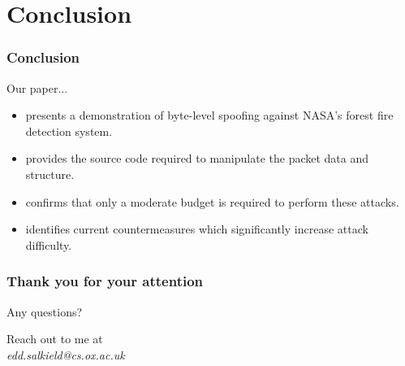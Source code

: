 \documentclass{beamer}
\begin{document}
\section{Conclusion}

\begin{frame}
  \frametitle{Conclusion}

  Our paper...
  \pause
  \begin{itemize}[<+->]
    \item presents a demonstration of byte-level spoofing against NASA's forest fire detection system.
    \item provides the source code required to manipulate the packet data and structure.
    \item confirms that only a moderate budget is required to perform these attacks.
    \item identifies current countermeasures which significantly increase attack difficulty.
  \end{itemize}
\end{frame}

\begin{frame}
  \frametitle{Thank you for your attention}

  \vspace{-1.2cm}
  \begin{center}
    \Large
    Any questions?
  \end{center}
  \vspace{1cm}

  \begin{center}
    Reach out to me at \\
    \textit{edd.salkield@cs.ox.ac.uk}
  \end{center}
\end{frame}
\end{document}
